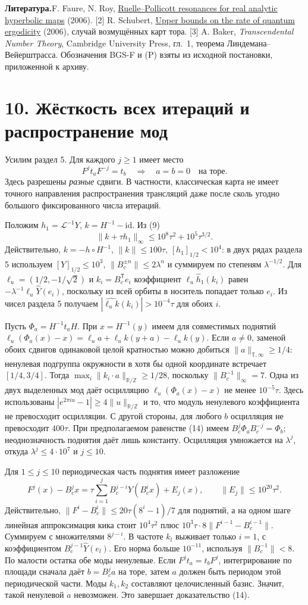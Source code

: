 \documentclass[11pt,a4paper]{article}
\newcommand{\R}{\mathbb R}
\newcommand{\Z}{\mathbb Z}
\newcommand{\sect}[1]{\section*{\sffamily\color{ink}#1}}
\newcommand{\subt}[1]{\par\medskip\noindent\textbf{#1.}\quad}
\begin{document}
\subt{Литература} [1] F. Faure, N. Roy, \href{https://doi.org/10.1088/0951-7715/19/6/002}{Ruelle--Pollicott resonances for real analytic hyperbolic maps} (2006). [2] R. Schubert, \href{https://arxiv.org/abs/math-ph/0503045}{Upper bounds on the rate of quantum ergodicity} (2006), случай возмущённых карт тора. [3] A. Baker, \emph{Transcendental Number Theory}, Cambridge University Press, гл.~1, теорема Линдемана--Вейерштрасса. Обозначения BGS-F и (P) взяты из исходной постановки, приложенной к архиву.
\newpage
\sect{10. Жёсткость всех итераций и распространение мод}
Усилим раздел 5. Для каждого $j\ge1$ имеет место
\[
 F^j t_a F^{-j}=t_b\quad\Longrightarrow\quad a=b=0\quad\text{на торе}.  \tag{14}
\]
Здесь разрешены \emph{разные} сдвиги. В частности, классическая карта не имеет точного направления распространения трансляций даже после сколь угодно большого фиксированного числа итераций.

Положим $h_1=\mathcal L^{-1}Y$, $k=H^{-1}-\mathrm{id}$. Из (9)
\[
 \|k+\tau h_1\|_\infty\le10^8\tau^2+10^5\tau^{3/2}.
\]
Действительно, $k=-h\circ H^{-1}$, $\|k\|\le100\tau$, $[h_1]_{1/2}<10^4$: в двух рядах раздела 5 используем $[Y]_{1/2}\le10^3$, $\|B_c^{\pm n}\|\le2\lambda^n$ и суммируем по степеням $\lambda^{-1/2}$. Для $\ell_u=(1/2,-1/\sqrt2)$ и $k_i=B_c^{\mathsf T}e_i$ коэффициент $\ell_u\widehat h_1(k_i)$ равен $-\lambda^{-1}\ell_u\widehat Y(e_i)$, поскольку из всей орбиты в носитель попадает только $e_i$. Из чисел раздела 5 получаем
$|\widehat{\ell_u k}(k_i)|>10^{-4}\tau$ для обоих $i$.

Пусть $\Phi_a=H^{-1}t_aH$. При $x=H^{-1}(y)$ имеем для совместимых поднятий
$\ell_u(\Phi_a(x)-x)=\ell_u a+\ell_u k(y+a)-\ell_u k(y)$.
Если $a\ne0$, заменой обоих сдвигов одинаковой целой кратностью можно добиться $\|a\|_{\mathbb T,\infty}\ge1/4$: ненулевая подгруппа окружности в хотя бы одной координате встречает $[1/4,3/4]$. Тогда $\max_i\|k_i\cdot a\|_{\R/\Z}\ge1/28$, поскольку $\|B_c^{-1}\|_\infty=7$. Одна из двух выделенных мод даёт осцилляцию $\ell_u(\Phi_a(x)-x)$ не менее $10^{-5}\tau$. Здесь использованы $|e^{2\pi iu}-1|\ge4\|u\|_{\R/\Z}$ и то, что модуль ненулевого коэффициента не превосходит осцилляции. С другой стороны, для любого $b$ осцилляция не превосходит $400\tau$. При предполагаемом равенстве (14) имеем $B_c^j\Phi_a B_c^{-j}=\Phi_b$; неоднозначность поднятия даёт лишь константу. Осцилляция умножается на $\lambda^j$, откуда $\lambda^j\le4\cdot10^7$ и $j\le10$.

Для $1\le j\le10$ периодическая часть поднятия имеет разложение
\[
 F^j(x)-B_c^jx=\tau\sum_{i=1}^j B_c^{j-i}Y(B_c^ix)+E_j(x),
 \qquad \|E_j\|\le10^{20}\tau^2 .
\]
Действительно, $\|F^i-B_c^i\|\le20\tau(8^i-1)/7$ для поднятий, а на одном шаге линейная аппроксимация кика стоит $10^4\tau^2$ плюс $10^3\tau\cdot8\|F^{i-1}-B_c^{i-1}\|$. Суммируем с множителями $8^{j-i}$. В частоте $k_l$ выживает только $i=1$, с коэффициентом $B_c^{j-1}\widehat Y(e_l)$. Его норма больше $10^{-11}$, используя $\|B_c^{-1}\|<8$. По малости остатка обе моды ненулевые. Если $F^jt_a=t_bF^j$, интегрирование по площади сначала даёт $b=B_c^ja$ на торе, затем $a$ должен быть периодом этой периодической части. Моды $k_1,k_2$ составляют целочисленный базис. Значит, такой ненулевой $a$ невозможен. Это завершает доказательство (14).
\end{document}
